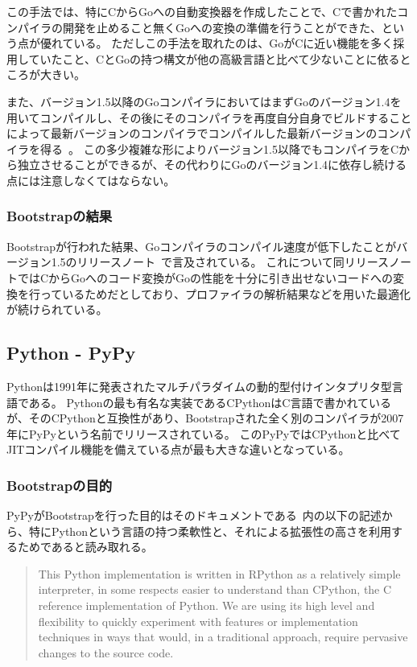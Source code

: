 この手法では、特にCからGoへの自動変換器を作成したことで、Cで書かれたコンパイラの開発を止めること無くGoへの変換の準備を行うことができた、という点が優れている。
ただしこの手法を取れたのは、GoがCに近い機能を多く採用していたこと、CとGoの持つ構文が他の高級言語と比べて少ないことに依るところが大きい。

また、バージョン1.5以降のGoコンパイラにおいてはまずGoのバージョン1.4を用いてコンパイルし、その後にそのコンパイラを再度自分自身でビルドすることによって最新バージョンのコンパイラでコンパイルした最新バージョンのコンパイラを得る~\cite{go-bootstrap-plan}。
この多少複雑な形によりバージョン1.5以降でもコンパイラをCから独立させることができるが、その代わりにGoのバージョン1.4に依存し続ける点には注意しなくてはならない。

\subsubsection{Bootstrapの結果}

Bootstrapが行われた結果、Goコンパイラのコンパイル速度が低下したことがバージョン1.5のリリースノート~\cite{go-15-release}で言及されている。
これについて同リリースノートではCからGoへのコード変換がGoの性能を十分に引き出せないコードへの変換を行っているためだとしており、プロファイラの解析結果などを用いた最適化が続けられている。


\subsection{Python - PyPy}
\label{side-effect:instance:python}

Pythonは1991年に発表されたマルチパラダイムの動的型付けインタプリタ型言語である。
Pythonの最も有名な実装であるCPythonはC言語で書かれているが、そのCPythonと互換性があり、Bootstrapされた全く別のコンパイラが2007年にPyPyという名前でリリースされている。
このPyPyではCPythonと比べてJITコンパイル機能を備えている点が最も大きな違いとなっている。~\cite{pypy}

\subsubsection{Bootstrapの目的}

PyPyがBootstrapを行った目的はそのドキュメントである~\cite{pypy-doc}内の以下の記述から、特にPythonという言語の持つ柔軟性と、それによる拡張性の高さを利用するためであると読み取れる。

\begin{quotation}
This Python implementation is written in RPython as a relatively simple interpreter, in some respects easier to understand than CPython, the C reference implementation of Python. We are using its high level and flexibility to quickly experiment with features or implementation techniques in ways that would, in a traditional approach, require pervasive changes to the source code.
\end{quotation}



